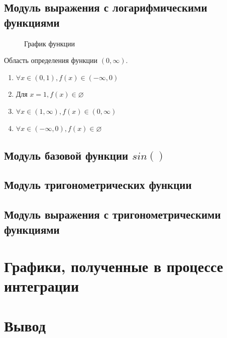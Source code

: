 \documentclass[a4paper,10pt]{article}
\begin{document}
    \subsection*{Модуль выражения с логарифмическими функциями}
		
		\begin{figure}[h!]
			\caption{График функции}
		\end{figure}

		Область определения функции $(0, \infty)$. 
		\begin{enumerate}
			\item $\forall x \in (0, 1), f(x) \in (-\infty, 0)$
			\item $\text{Для } x = 1, f(x) \in \varnothing$
			\item $\forall x \in (1, \infty), f(x) \in (0, \infty)$
			\item $\forall x \in (-\infty, 0), f(x) \in \varnothing$
		\end{enumerate}

    \subsection*{Модуль базовой функции $sin()$}
    \subsection*{Модуль тригонометрических функции} 
    \subsection*{Модуль выражения с тригонометрическими функциями}
    
\section*{Графики, полученные в процессе интеграции}
\section*{Вывод}
\end{document}
